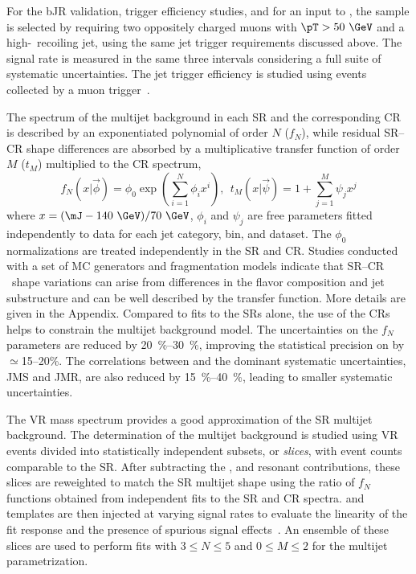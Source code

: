 \documentclass[PAPER, cernpreprint=true, atlasdraft=false, UKenglish, texmf, orcidlogo]{atlasdoc}
\begin{document}
For the bJR validation, trigger efficiency studies,
and for an input to \KGNTX, the \Zmmjets sample is selected by requiring two oppositely charged muons with $\pT>50~\GeV$ and a high-\pT\ recoiling jet, using the same jet trigger requirements discussed above.
The \Zmm signal rate is measured in the same three \pT intervals considering a full suite of systematic uncertainties. The jet trigger efficiency is studied using \Zmm events collected by a muon trigger~\cite{TRIG-2018-01}.





The \mJ spectrum of the multijet background in each SR and the corresponding CR is described by an exponentiated polynomial of order $N$ ($f_N$), while residual SR--CR shape differences are absorbed by a multiplicative transfer function of order $M$ ($t_M$) multiplied to the CR \mJ spectrum,
\[
f_N(x|\vec{\phi}) = \phi_0 \exp\!\left(\sum_{i=1}^N \phi_i x^i\right), \ \ t_M(x|\vec{\psi}) = 1 + \sum_{j=1}^M \psi_j x^j
\]
where $x = (\mJ - 140~\GeV)/70~\GeV$, $\phi_i$ and $\psi_j$ are free parameters fitted independently to data for each jet category, \pt bin, and dataset. The $\phi_0$ normalizations are treated independently in the SR and CR.
Studies conducted with a set of MC generators and fragmentation models indicate that SR--CR \mJ\ shape variations can arise from differences in the flavor composition and jet substructure and can be well described by the transfer function. More details are given in the Appendix.
Compared to fits to the SRs alone, the use of the CRs helps to constrain the multijet background model. The uncertainties on the $f_N$ parameters are reduced by \SIrange{20}{30}{\%}, improving the statistical precision on \muH by $\simeq$15--20\%. The correlations between \muH and the dominant systematic uncertainties, JMS and JMR, are also reduced by \SIrange{15}{40}{\%}, leading to smaller systematic uncertainties.

The VR mass spectrum provides a good approximation of the SR multijet background. The determination of the multijet background is studied using VR events divided into statistically independent subsets, or \textit{slices}, with event counts comparable to the SR.
After subtracting the \Wboson, \Zboson and \ttbar resonant contributions, these slices are reweighted to match the SR multijet shape using the ratio of $f_N$ functions obtained from independent fits to the SR and CR spectra. \Zbb and \Hbb templates are then injected at varying signal rates to evaluate the linearity of the fit response and the presence of spurious signal effects~\cite{ATL-PHYS-PUB-2020-028}.
An ensemble of these slices
are used to perform fits with $3 \leq N \leq 5$ and $0 \leq M \leq 2$ for the multijet parametrization.
\end{document}

